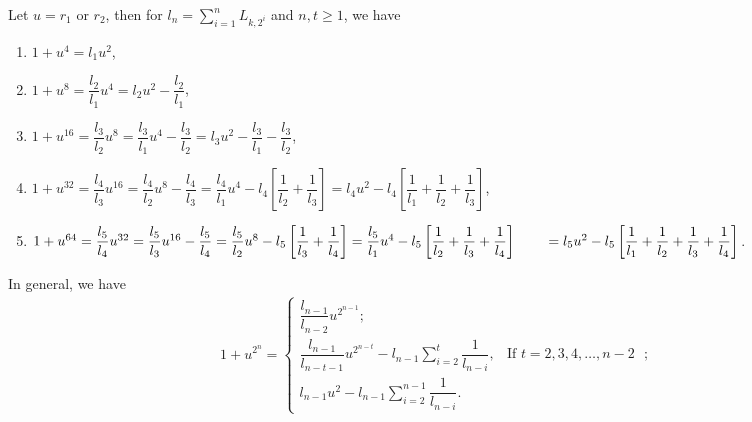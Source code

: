 \begin{lemma} Let $u=r_{1}$ or $r_{2}$, then for $l_n=\sum\limits_{i=1}^nL_{k,2^i}$ and $n, t\geq 1$, we have \label{3.9}
\begin{enumerate}
\item $1+u^4=l_1u^2$,
\item $ 1+u^8=\dfrac{l_2}{l_1}u^4=l_2u^2-\dfrac{l_2}{l_1}$,
\item $ 1+u^{16}=\dfrac{l_3}{l_2}u^8=\dfrac{l_3}{l_1}u^4-\dfrac{l_3}{l_2}=l_3u^2-\dfrac{l_3}{l_1}-\dfrac{l_3}{l_2}$,
\item $ 1+u^{32}=\dfrac{l_4}{l_3}u^{16}=\dfrac{l_4}{l_2}u^8-\dfrac{l_4}{l_3}=\dfrac{l_4}{l_1}u^4-l_4\left[\dfrac{1}{l_2}+\dfrac{1}{l_3}\right]=l_4u^2-l_4\left[\dfrac{1}{l_1}+\dfrac{1}{l_2}+\dfrac{1}{l_3}\right]$,
\item $ 1+u^{64}=\dfrac{l_5}{l_4}u^{32}=\dfrac{l_5}{l_3}u^{16}-\dfrac{l_5}{l_4}=\dfrac{l_5}{l_2}u^8-l_5\left[\dfrac{1}{l_3}+\dfrac{1}{l_4}\right]=\dfrac{l_5}{l_1}u^4-l_5\left[\dfrac{1}{l_2}+\dfrac{1}{l_3}+\dfrac{1}{l_4}\right]\\\qquad=l_5u^2-l_5\left[\dfrac{1}{l_1}+\dfrac{1}{l_2}+\dfrac{1}{l_3}+\dfrac{1}{l_4}\right]$.
\end{enumerate}
In general, we have
\begin{align*}
 1+u^{2^n}= \begin{cases}
 \dfrac{l_{n-1}}{l_{n-2}}u^{2^{n-1}};\\
\dfrac{l_{n-1}}{l_{n-t-1}}u^{2^{n-t}}-l_{n-1}\sum\limits_{i=2}^{t}\dfrac{1}{l_{n-i}}, & \text{If $t=2, 3, 4,\hdots, n-2 $ };\\l_{n-1}u^2-l_{n-1}\sum\limits_{i=2}^{n-1}\dfrac{1}{l_{n-i}}.
 \end{cases}
\end{align*} 
\end{lemma}
